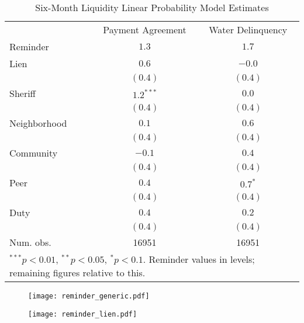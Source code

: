 \documentclass[12pt]{article}
\begin{document}
\begin{appendix}
\begin{table}[htbp!]
\caption{Six-Month Liquidity Linear Probability Model Estimates}\label{liquidversuscontrol}
\begin{center}
\begin{tabular}{l c c }
\hline
 & \multicolumn{1}{c}{Payment Agreement} & \multicolumn{1}{c}{Water Delinquency} \\
Reminder     & $1.3$ & $1.7$ \\
\hline
Lien         & $0.6$       & $-0.0$      \\
             & $(0.4)$     & $(0.4)$     \\
Sheriff      & $1.2^{***}$ & $0.0$       \\
             & $(0.4)$     & $(0.4)$     \\
Neighborhood & $0.1$       & $0.6$       \\
             & $(0.4)$     & $(0.4)$     \\
Community    & $-0.1$      & $0.4$       \\
             & $(0.4)$     & $(0.4)$     \\
Peer         & $0.4$       & $0.7^{*}$   \\
             & $(0.4)$     & $(0.4)$     \\
Duty         & $0.4$       & $0.2$       \\
             & $(0.4)$     & $(0.4)$     \\
\hline
Num. obs.    & 16951       & 16951       \\
\hline
\multicolumn{3}{l}{\scriptsize{$^{***}p<0.01$, $^{**}p<0.05$, $^*p<0.1$. Reminder values in levels; remaining figures relative to this.}}
\end{tabular}
\end{center}
\end{table}
\pagebreak

\begin{figure}[htbp!]
\begin{center}
\texttt{[image: reminder\_generic.pdf]}
\end{center}
\end{figure}

\begin{figure}[htbp!]
\begin{center}
\texttt{[image: reminder\_lien.pdf]}
\end{center}
\end{figure}

\end{appendix}
\end{document}

